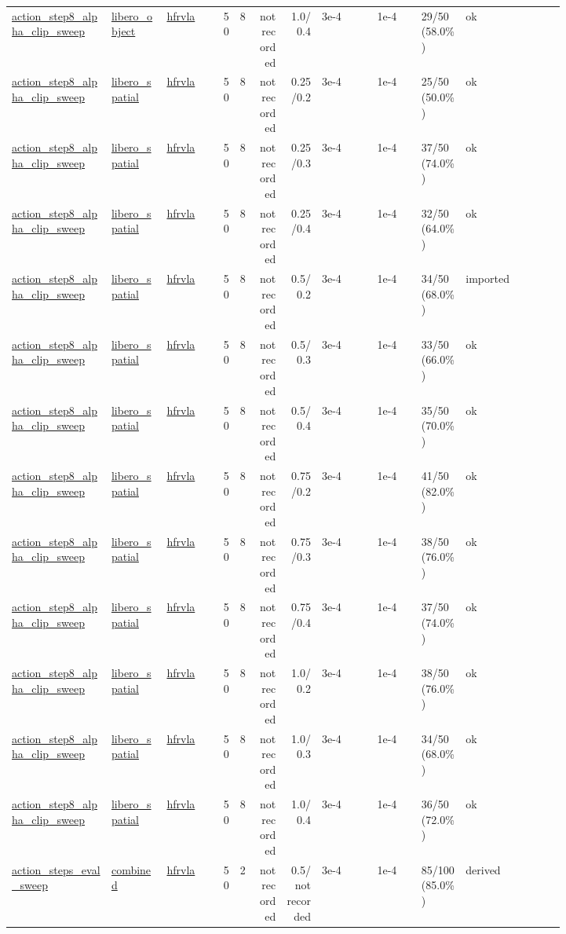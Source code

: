 \begin{tiny}
\begin{longtable}{@{}p{0.18\linewidth}p{0.10\linewidth}p{0.10\linewidth}rrrrp{0.10\linewidth}p{0.08\linewidth}p{0.08\linewidth}p{0.11\linewidth}p{0.07\linewidth}@{}}
\url{action_step8_alpha_clip_sweep} & \url{libero_object} & \url{hfrvla} & 50 & 8 & not recorded & 1.0/0.4 & 3e-4 & 1e-4 & 29/50 (58.0\%) & ok \\
\url{action_step8_alpha_clip_sweep} & \url{libero_spatial} & \url{hfrvla} & 50 & 8 & not recorded & 0.25/0.2 & 3e-4 & 1e-4 & 25/50 (50.0\%) & ok \\
\url{action_step8_alpha_clip_sweep} & \url{libero_spatial} & \url{hfrvla} & 50 & 8 & not recorded & 0.25/0.3 & 3e-4 & 1e-4 & 37/50 (74.0\%) & ok \\
\url{action_step8_alpha_clip_sweep} & \url{libero_spatial} & \url{hfrvla} & 50 & 8 & not recorded & 0.25/0.4 & 3e-4 & 1e-4 & 32/50 (64.0\%) & ok \\
\url{action_step8_alpha_clip_sweep} & \url{libero_spatial} & \url{hfrvla} & 50 & 8 & not recorded & 0.5/0.2 & 3e-4 & 1e-4 & 34/50 (68.0\%) & imported \\
\url{action_step8_alpha_clip_sweep} & \url{libero_spatial} & \url{hfrvla} & 50 & 8 & not recorded & 0.5/0.3 & 3e-4 & 1e-4 & 33/50 (66.0\%) & ok \\
\url{action_step8_alpha_clip_sweep} & \url{libero_spatial} & \url{hfrvla} & 50 & 8 & not recorded & 0.5/0.4 & 3e-4 & 1e-4 & 35/50 (70.0\%) & ok \\
\url{action_step8_alpha_clip_sweep} & \url{libero_spatial} & \url{hfrvla} & 50 & 8 & not recorded & 0.75/0.2 & 3e-4 & 1e-4 & 41/50 (82.0\%) & ok \\
\url{action_step8_alpha_clip_sweep} & \url{libero_spatial} & \url{hfrvla} & 50 & 8 & not recorded & 0.75/0.3 & 3e-4 & 1e-4 & 38/50 (76.0\%) & ok \\
\url{action_step8_alpha_clip_sweep} & \url{libero_spatial} & \url{hfrvla} & 50 & 8 & not recorded & 0.75/0.4 & 3e-4 & 1e-4 & 37/50 (74.0\%) & ok \\
\url{action_step8_alpha_clip_sweep} & \url{libero_spatial} & \url{hfrvla} & 50 & 8 & not recorded & 1.0/0.2 & 3e-4 & 1e-4 & 38/50 (76.0\%) & ok \\
\url{action_step8_alpha_clip_sweep} & \url{libero_spatial} & \url{hfrvla} & 50 & 8 & not recorded & 1.0/0.3 & 3e-4 & 1e-4 & 34/50 (68.0\%) & ok \\
\url{action_step8_alpha_clip_sweep} & \url{libero_spatial} & \url{hfrvla} & 50 & 8 & not recorded & 1.0/0.4 & 3e-4 & 1e-4 & 36/50 (72.0\%) & ok \\
\url{action_steps_eval_sweep} & \url{combined} & \url{hfrvla} & 50 & 2 & not recorded & 0.5/not recorded & 3e-4 & 1e-4 & 85/100 (85.0\%) & derived \\

\end{longtable}
\end{tiny}
